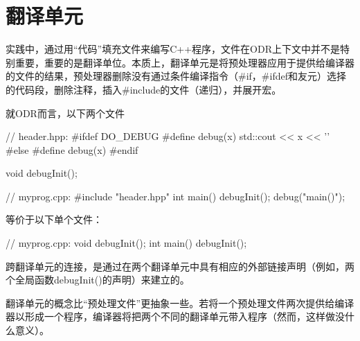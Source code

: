 \section{翻译单元}
实践中，通过用“代码”填充文件来编写C++程序，文件在ODR上下文中并不是特别重要，重要的是翻译单位。本质上，翻译单元是将预处理器应用于提供给编译器的文件的结果，预处理器删除没有通过条件编译指令（\#if，\#ifdef和友元）选择的代码段，删除注释，插入\#include的文件（递归），并展开宏。

就ODR而言，以下两个文件

\begin{cpp}
// header.hpp:
#ifdef DO_DEBUG
#define debug(x) std::cout << x << '\n'
#else
#define debug(x)
#endif

void debugInit();

// myprog.cpp:
#include "header.hpp"
int main() {
	debugInit();
	debug("main()");
}
\end{cpp}

等价于以下单个文件：

\begin{cpp}
// myprog.cpp:
void debugInit();
int main() {
	debugInit();
}
\end{cpp}

跨翻译单元的连接，是通过在两个翻译单元中具有相应的外部链接声明（例如，两个全局函数debugInit()的声明）来建立的。

翻译单元的概念比“预处理文件”更抽象一些。若将一个预处理文件两次提供给编译器以形成一个程序，编译器将把两个不同的翻译单元带入程序（然而，这样做没什么意义）。









































